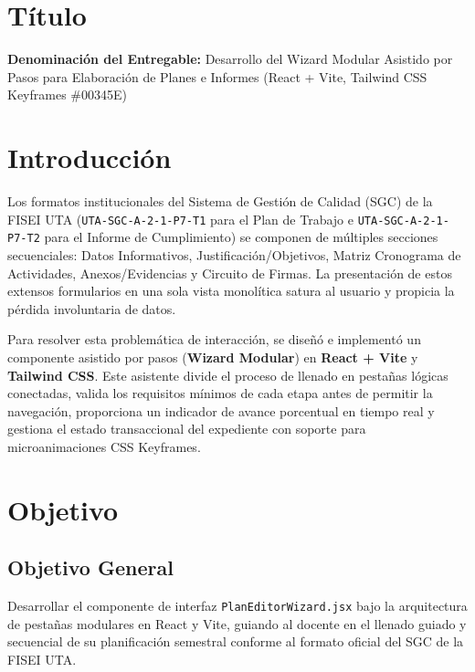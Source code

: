 \documentclass[12pt,a4paper]{article}
\begin{document}
\section{Título}
\textbf{Denominación del Entregable:} Desarrollo del Wizard Modular Asistido por Pasos para Elaboración de Planes e Informes (React + Vite, Tailwind CSS Keyframes \#00345E)



\section{Introducción}
Los formatos institucionales del Sistema de Gestión de Calidad (SGC) de la FISEI UTA (\texttt{UTA-SGC-A-2-1-P7-T1} para el Plan de Trabajo e \texttt{UTA-SGC-A-2-1-P7-T2} para el Informe de Cumplimiento) se componen de múltiples secciones secuenciales: Datos Informativos, Justificación/Objetivos, Matriz Cronograma de Actividades, Anexos/Evidencias y Circuito de Firmas. La presentación de estos extensos formularios en una sola vista monolítica satura al usuario y propicia la pérdida involuntaria de datos.

Para resolver esta problemática de interacción, se diseñó e implementó un componente asistido por pasos (\textbf{Wizard Modular}) en \textbf{React + Vite} y \textbf{Tailwind CSS}. Este asistente divide el proceso de llenado en pestañas lógicas conectadas, valida los requisitos mínimos de cada etapa antes de permitir la navegación, proporciona un indicador de avance porcentual en tiempo real y gestiona el estado transaccional del expediente con soporte para microanimaciones CSS Keyframes.

\section{Objetivo}

\subsection{Objetivo General}
Desarrollar el componente de interfaz \texttt{PlanEditorWizard.jsx} bajo la arquitectura de pestañas modulares en React y Vite, guiando al docente en el llenado guiado y secuencial de su planificación semestral conforme al formato oficial del SGC de la FISEI UTA.
\end{document}
